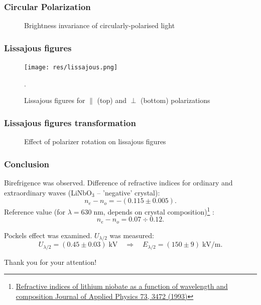\documentclass{beamer}
\begin{document}
	\begin{frame}
		\frametitle{Circular Polarization}
		\begin{figure}
			\centering
			\caption{Brightness invariance of circularly-polarised light}
		\end{figure}
	\end{frame}

	\begin{frame}
		\frametitle{Lissajous figures}


		\begin{figure}
			\centering
			\texttt{[image: res/lissajous.png]}
			\vspace{-10pt}
			\caption{\footnotesize  Lissajous figures for $\parallel$ (top) and $\perp$ (bottom) polarizations}.
		\end{figure}
				
	\end{frame}

	\begin{frame}
		\frametitle{Lissajous figures transformation}
		\begin{figure}
			\centering
			\movie[width=\linewidth, height=0.5625\linewidth, poster]{}{res/rotation.mp4}
			\caption{Effect of polarizer rotation on lissajous figures}
		\end{figure}
				
		
	\end{frame}

	\begin{frame}
		\frametitle{Conclusion}
		
		Birefrigence was observed. Difference of refractive indices for ordinary and extraordinary waves (LiNbO$_3$ -- 'negative' crystal):
		$$ n_e - n_o = -(0.115 \pm 0.005).$$
		Reference value (for $\lambda = 630 \; \text{nm}$, depends on crystal composition)\footnote{\href{https://doi.org/10.1063/1.352951}{
			Refractive indices of lithium niobate as a function of wavelength and composition 
			Journal of Applied Physics 73, 3472 (1993)}}
		:
		$$ n_e - n_o = 0.07 \div 0.12.$$
		
		Pockels effect was examined. $U_{\lambda/2}$ was measured:
		$$ U_{\lambda/2} = (0.45 \pm 0.03) \; \text{kV}\quad \Rightarrow \quad E_{\lambda/2} = (150 \pm 9) \; \text{kV}/\text{m}.$$
	\end{frame}
	
	\begin{frame}[plain,c]
		\begin{center}
			\huge {} Thank you for your attention!
		\end{center}
	\end{frame}
		
	
\end{document}
